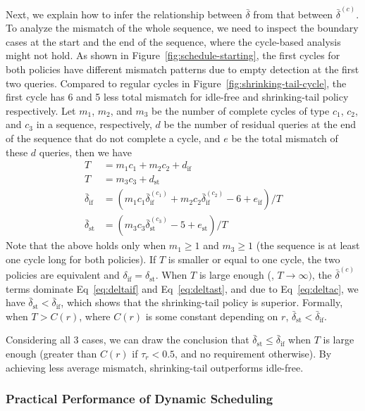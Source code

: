 Next, we explain how to infer the relationship between $\bar{\delta}$ from that between $\bar{\delta}^{(c)}$. To analyze the mismatch of the whole sequence, we need to inspect the boundary cases at the start and the end of the sequence, where the cycle-based analysis might not hold. As shown in Figure~\ref{fig:schedule-starting}, the first cycles for both policies have different mismatch patterns due to empty detection at the first two queries. Compared to regular cycles in Figure~\ref{fig:shrinking-tail-cycle}, the first cycle has 6 and 5 less total mismatch for idle-free and shrinking-tail policy respectively. Let $m_1$, $m_2$, and $m_3$ be the number of complete cycles of type $c_1$, $c_2$, and $c_3$ in a sequence, respectively, $d$ be the number of residual queries at the end of the sequence that do not complete a cycle, and $e$ be the total mismatch of these $d$ queries, then we have
\begin{align}
    T & = m_1 c_1 + m_2 c_2 + d_{\text{if}} \label{eq:Tif} \\
    T & = m_3 c_3 + d_{\text{st}} \label{eq:Tst} \\
    \bar{\delta}_{\text{if}} & = (m_1 c_1 \bar{\delta}^{(c_1)}_{\text{if}} + m_2 c_2 \bar{\delta}^{(c_2)}_{\text{if}} - 6 + e_{\text{if}})/T \label{eq:deltaif} \\
    \bar{\delta}_{\text{st}} & = (m_3 c_3 \bar{\delta}^{(c_3)}_{\text{st}} - 5 + e_{\text{st}})/T  \label{eq:deltast}
\end{align}
Note that the above holds only when $m_1 \geq 1$ and $m_3 \geq 1$ (the sequence is at least one cycle long for both policies). If $T$ is smaller or equal to one cycle, the two policies are equivalent and $\delta_{\text{if}} = \delta_{\text{st}}$. When $T$ is large enough (\eg, $T \to \infty)$, the $\bar{\delta}^{(c)}$ terms dominate Eq~\ref{eq:deltaif} and Eq~\ref{eq:deltast}, and due to Eq~\ref{eq:deltac}, we have $\bar{\delta}_{\text{st}} < \bar{\delta}_{\text{if}}$, which shows that the shrinking-tail policy is superior.
Formally, when $T > C(r)$, where $C(r)$ is some constant depending on $r$, $\bar{\delta}_{\text{st}} < \bar{\delta}_{\text{if}}$.

 Considering all 3 cases, we can draw the conclusion that $\bar{\delta}_{\text{st}} \leq \bar{\delta}_{\text{if}}$ when $T$ is large enough (greater than $C(r)$ if $\tau_r < 0.5$, and no requirement otherwise). By achieving less average mismatch, shrinking-tail outperforms idle-free.


\subsubsection{Practical Performance of Dynamic Scheduling}

